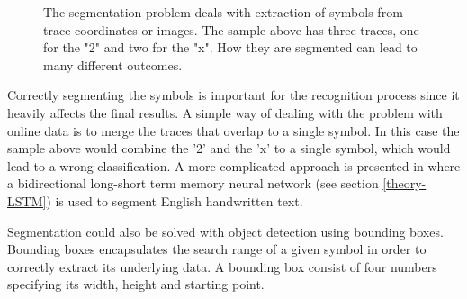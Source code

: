 \begin{figure}[H]
\centering
{}
\caption{The segmentation problem deals with extraction of symbols from trace-coordinates or images. The sample above has three traces, one for the "2"  and two for the "x". How they are segmented can lead to many different outcomes.}
\label{fig:segmentation_1}
\end{figure}

Correctly segmenting the symbols is important for the recognition process since it heavily affects the final results. A simple way of dealing with the problem with online data is to merge the traces that overlap to a single symbol. In this case the sample above would combine the '2' and the 'x' to a single symbol, which would lead to a wrong classification. A more complicated approach is presented in \cite{nguyen_improved_2015} where a bidirectional long-short term memory neural network (see section \ref{theory-LSTM}) is used to segment English handwritten text.

Segmentation could also be solved with object detection using bounding boxes. Bounding boxes encapsulates the search range of a given symbol in order to correctly extract its underlying data. A bounding box consist of four numbers specifying its width, height and starting point.




